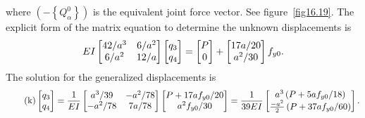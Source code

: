 \documentclass{AeroStructure-ERJohnson}
\begin{document}
\begin{example*}
\noindent where $\left(-\left\{Q_{\alpha}^{0}\right\}\right)$ is the equivalent joint force vector. See figure~\ref{fig16.19}. The explicit form of the matrix equation to determine the unknown displacements is
\[
E I\left[\begin{array}{@{}cc@{}}42 / a^{3} & 6 / a^{2} \\6 / a^{2} & 12 / a\end{array}\right]\left[\begin{array}{@{}l@{}}q_{3} \\q_{4}\end{array}\right]=\left[\begin{array}{@{}c@{}}P \\0\end{array}\right]+\left[\begin{array}{@{}c@{}}17 a / 20 \\a^{2} / 30\end{array}\right] f_{y 0}.
\]
The solution for the generalized displacements is
\begin{align}\label{eq16.7k}\tag{k}
\left[\begin{array}{@{}l@{}}q_{3} \\q_{4}\end{array}\right]=\frac{1}{E I}\left[\begin{array}{@{}cc@{}}a^{3} / 39 & -a^{2} / 78 \\-a^{2} / 78 & 7 a / 78\end{array}\right]\left[\begin{array}{@{}c@{}}P+17 a f_{y 0} / 20 \\a^{2} f_{y 0} / 30\end{array}\right]=\frac{1}{39 E I}\left[\begin{array}{@{}c@{}}
a^{3}\left(P+5 a f_{y 0} / 18\right) \\
\frac{-a^{2}}{2}\left(P+37 a f_{y 0} / 60\right)
\end{array}\right].
\end{align}

\vspace*{-1pc}


\end{example*}
\end{document}
